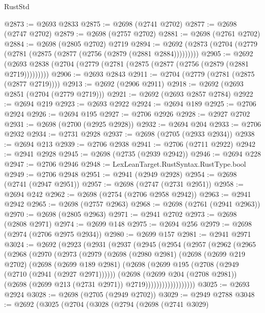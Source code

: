 \begin{lexlean}{RustStd}
\begin{coremodule}
@2873 := @2693 @2833
@2875 := @2698 (@2741 @2702)
@2877 := @2698 (@2747 @2702)
@2879 := @2698 (@2757 @2702)
@2881 := @2698 (@2761 @2702)
@2884 := @2698 (@2805 @2702) @2719
@2894 := @2692 (@2873 (@2704 (@2779 (@2781 (@2875 (@2877 (@2756 (@2879 (@2881 @2884)))))))))
@2905 := @2692 (@2693 @2838 (@2704 (@2779 (@2781 (@2875 (@2877 (@2756 (@2879 (@2881 @2719)))))))))
@2906 := @2693 @2843
@2911 := @2704 (@2779 (@2781 (@2875 (@2877 @2719))))
@2913 := @2692 (@2906 @2911)
@2918 := @2692 (@2693 @2851 (@2704 (@2779 @2719)))
@2921 := @2692 (@2693 @2857 @2784)
@2922 := @2694 @219
@2923 := @2693 @2922
@2924 := @2694 @189
@2925 := @2706 @2924
@2926 := @2694 @195
@2927 := @2706 @2926
@2928 := @2927 @2702
@2931 := @2698 (@2700 (@2925 @2928))
@2932 := @2694 @204
@2933 := @2706 @2932
@2934 := @2731 @2928
@2937 := @2698 (@2705 (@2933 @2934))
@2938 := @2694 @213
@2939 := @2706 @2938
@2941 := @2706 (@2711 @2922)
@2942 := @2941 @2928
@2945 := @2698 (@2735 (@2939 @2942))
@2946 := @2694 @228
@2947 := @2706 @2946
@2948 := LexLeanTarget.RustSyntax.RustType.bool
@2949 := @2706 @2948
@2951 := @2941 (@2949 @2928)
@2954 := @2698 (@2741 (@2947 @2951))
@2957 := @2698 (@2747 (@2731 @2951))
@2958 := @2694 @242
@2962 := @2698 (@2754 (@2706 @2958 @2942))
@2963 := @2941 @2942
@2965 := @2698 (@2757 @2963)
@2968 := @2698 (@2761 (@2941 @2963))
@2970 := @2698 (@2805 @2963)
@2971 := @2941 @2702
@2973 := @2698 (@2808 @2971)
@2974 := @2699 @148
@2975 := @2694 @256
@2979 := @2698 (@2974 (@2706 @2975 @2934))
@2980 := @2699 @157
@2981 := @2941 @2971
@3024 := @2692
    (@2923
      (@2931
        (@2937
          (@2945
            (@2954
              (@2957
                (@2962
                  (@2965
                    (@2968
                      (@2970
                        (@2973
                          (@2979
                            (@2698
                              (@2980 @2981)
                              (@2698
                                (@2699 @219 @2702)
                                (@2698
                                  (@2699 @189 @2981)
                                  (@2698
                                    (@2699 @195 (@2708 (@2949 (@2710 (@2941 (@2927 @2971))))))
                                    (@2698
                                      (@2699 @204 (@2708 @2981))
                                      (@2698 (@2699 @213 (@2731 @2971)) @2719))))))))))))))))))
@3025 := @2693 @2924
@3028 := @2698 (@2705 (@2949 @2702))
@3029 := @2949 @2788
@3048 := @2692
    (@3025
      (@2704
        (@3028
          (@2794
            (@2698
              (@2741 @3029)

\end{coremodule}
\end{lexlean}
